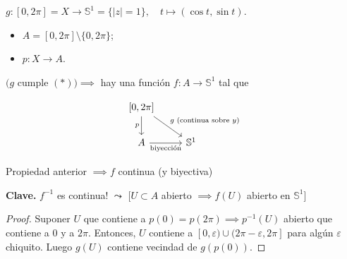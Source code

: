 \begin{eg}
	$g : [0,2\pi] = X \to \mathbb{S}^1 = \{|z| = 1\},\quad t \mapsto (\cos t,\sin t)$.
	\begin{itemize}
		\item $A = [0,2\pi] \setminus \{0,2\pi\}$;

		\item $p: X \to A$.
	\end{itemize}
	$(g$ cumple $(*)) \implies$ hay una función $f: A \to \mathbb{S}^1$ tal que 

	\[
	\begin{tikzcd}
		{[0,2\pi]} \arrow[d, "p"'] \arrow[rd, "g \text{ (continua sobre } y)"] &              \\
		A \arrow[r, "\text{biyección}"']                                                 & \mathbb{S}^1
	\end{tikzcd}
	\]
\end{eg}

\noindent Propiedad anterior $\implies f$ continua (y biyectiva) \newline

\noindent \textbf{Clave.} $f^{-1}$ es continua! $\leadsto$ [$U\subset A$ abierto $\implies f(U)$ abierto en $\mathbb{S}^1$]

\begin{proof}
	Suponer $U$ que contiene a $p(0) = p(2\pi) \implies p^{-1}(U)$ abierto que contiene a $0$ y a $2\pi$. Entonces, $U$ contiene a $[0,\varepsilon)\cup (2\pi-\varepsilon,2\pi]$ para algún $\varepsilon$ chiquito. Luego $g(U)$ contiene vecindad de $g(p(0))$.
\end{proof}
